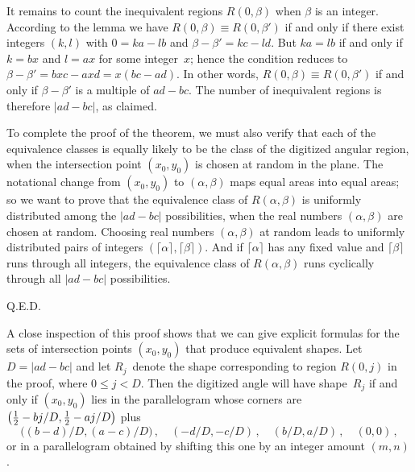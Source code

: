 It remains to count the inequivalent regions $R(0,\beta)$ when $\beta$
is an integer. According to the lemma we have $R(0,\beta)\equiv
R(0,\beta')$ if and only if there exist integers $(k,l)$ with
$0=ka-lb$ and $\beta-\beta'=kc-ld$. But $ka=lb$ if and only if $k=bx$
and $l=ax$ for some integer~$x$; hence the condition reduces to
$\beta-\beta'=bxc-axd=x(bc-ad)$. In other words, $R(0,\beta)\equiv
R(0,\beta')$ if and only if $\beta-\beta'$ is a multiple of $ad-bc$.
The number of inequivalent regions is therefore $\vert ad-bc\vert$, as
claimed. 

To complete the proof of the theorem, we must also verify that each of
the equivalence classes is equally likely to be the class of the
digitized angular region, when the intersection point $(x_0,y_0)$ is
chosen at random in the plane. The notational change from $(x_0,y_0)$
to $(\alpha,\beta)$ maps equal areas into equal areas; so we want to
prove that the equivalence class of $R(\alpha,\beta)$ is uniformly
distributed among the $\vert ad-bc\vert$ possibilities, when the real
numbers $(\alpha,\beta)$ are chosen at random. Choosing real numbers
$(\alpha,\beta)$ at random leads to uniformly distributed pairs of
integers $(\lceil\alpha\rceil,\lceil\beta\rceil)$. 
And if $\lceil\alpha\rceil$ has
any fixed value and $\lceil\beta\rceil$ runs through all integers, the
equivalence class of $R(\alpha,\beta)$ runs cyclically through all
$\vert ad-bc\vert$ possibilities.

Q.E.D.\quad\pfbox

\medskip
A close inspection of this proof shows that we can give explicit
formulas for the sets of intersection points $(x_0,y_0)$ that produce
equivalent shapes. Let $D=\vert ad-bc\vert$ and let $R_j$~denote the
shape corresponding to region $R(0,j)$ in the proof, where $0\leq
j<D$. Then the digitized angle will have shape~$R_j$ if and only if
$(x_0,y_0)$ lies in the parallelogram whose corners are $\bigl({1\over
2}-bj/D,{1\over 2}-aj/D\bigr)$ plus
$$\bigl((b-d)/D,(a-c)/D\bigr)\,,\quad (-d/D,-c/D)\,,\quad
(b/D,a/D)\,,\quad (0,0)\,,$$
or in a parallelogram obtained by shifting this one by an integer
amount $(m,n)$. 

